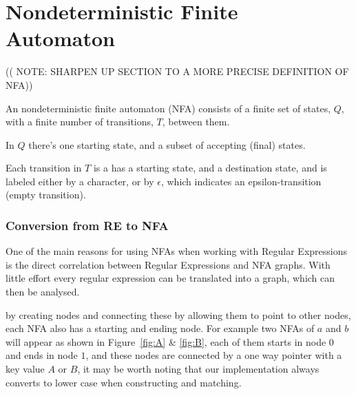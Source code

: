\section{Nondeterministic Finite Automaton}
(( NOTE: SHARPEN UP SECTION TO A MORE PRECISE DEFINITION OF NFA))

\begin{mydef}
An nondeterministic finite automaton (NFA) consists of a finite set of states, $Q$, with a finite number of transitions, $T$, between them.


In $Q$ there's one starting state, and a subset of accepting (final) states.

Each transition in $T$ is a has a starting state, and a destination state, and is labeled either by a character, or by $\epsilon$, which indicates an epsilon-transition (empty transition).
\end{mydef}

\subsubsection{Conversion from RE to NFA}
One of the main reasons for using NFAs when working with Regular Expressions is the direct correlation between Regular Expressions and NFA graphs. With little effort every regular expression can be translated into a graph, which can then be analysed.


 by creating nodes and connecting these by allowing them to point to other nodes, each NFA also has a starting and ending node. For example two NFAs of $a$ and $b$ will appear as shown in Figure~\ref{fig:A} \& \ref{fig:B}, each of them starts in node $0$ and ends in node $1$, and these nodes are connected by a one way pointer with a key value $A$ or $B$, it may be worth noting that our implementation always converts to lower case when constructing and matching.


